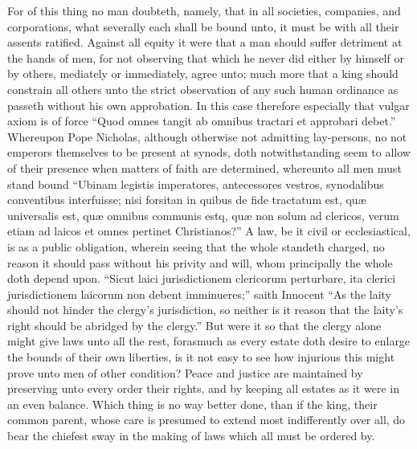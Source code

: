 For of this thing no man doubteth, namely, that in all societies, companies, and corporations, what severally each shall be bound unto, it must be with all their assents ratified. Against all equity it were that a man should suffer detriment at the hands of men, for not observing that which he never did either by himself or by others, mediately or immediately, agree unto; much more that a king should constrain all others unto the strict observation of any such human ordinance as passeth without his own approbation. In this case therefore especially that vulgar axiom is of force “Quod omnes tangit ab omnibus tractari et approbari debet.” Whereupon Pope Nicholas, although otherwise not admitting lay-persons, no not emperors themselves to be present at synods, doth notwithstanding seem to allow of their presence when matters of faith are determined, whereunto all men must  stand bound “Ubinam legistis imperatores, antecessores vestros, synodalibus conventibus interfuisse; nisi forsitan in quibus de fide tractatum est, quæ universalis est, quæ omnibus communis estq, quæ non solum ad clericos, verum etiam ad laicos et omnes pertinet Christianos?” A law, be it civil or ecclesiastical, is as a public obligation, wherein seeing that the whole standeth charged, no reason it should pass without his privity and will, whom principally the whole doth depend upon. “Sicut laici jurisdictionem clericorum perturbare, ita clerici jurisdictionem laicorum non debent imminueres;” saith Innocent “As the laity should not hinder the clergy’s jurisdiction, so neither is it reason that the laity’s right should be abridged by the clergy.” But were it so that the clergy alone might give laws unto all the rest, forasmuch as every estate doth desire to enlarge the bounds of their own liberties, is it not easy to see how injurious this might prove unto men of other condition? Peace and justice are maintained by preserving unto every order their rights, and by keeping all estates as it were in an even balance. Which thing is no way better done, than if the king, their common parent, whose care is presumed to extend most indifferently over all, do bear the chiefest sway in the making of laws which all must be ordered by.


